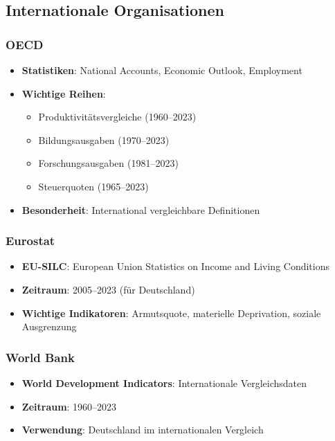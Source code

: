\subsection{Internationale Organisationen}

\subsubsection{OECD}
\begin{itemize}
\item \textbf{Statistiken}: National Accounts, Economic Outlook, Employment
\item \textbf{Wichtige Reihen}:
  \begin{itemize}
  \item Produktivitätsvergleiche (1960--2023)
  \item Bildungsausgaben (1970--2023)
  \item Forschungsausgaben (1981--2023)
  \item Steuerquoten (1965--2023)
  \end{itemize}
\item \textbf{Besonderheit}: International vergleichbare Definitionen
\end{itemize}

\subsubsection{Eurostat}
\begin{itemize}
\item \textbf{EU-SILC}: European Union Statistics on Income and Living Conditions
\item \textbf{Zeitraum}: 2005--2023 (für Deutschland)
\item \textbf{Wichtige Indikatoren}: Armutsquote, materielle Deprivation, soziale Ausgrenzung
\end{itemize}

\subsubsection{World Bank}
\begin{itemize}
\item \textbf{World Development Indicators}: Internationale Vergleichsdaten
\item \textbf{Zeitraum}: 1960--2023
\item \textbf{Verwendung}: Deutschland im internationalen Vergleich
\end{itemize}

